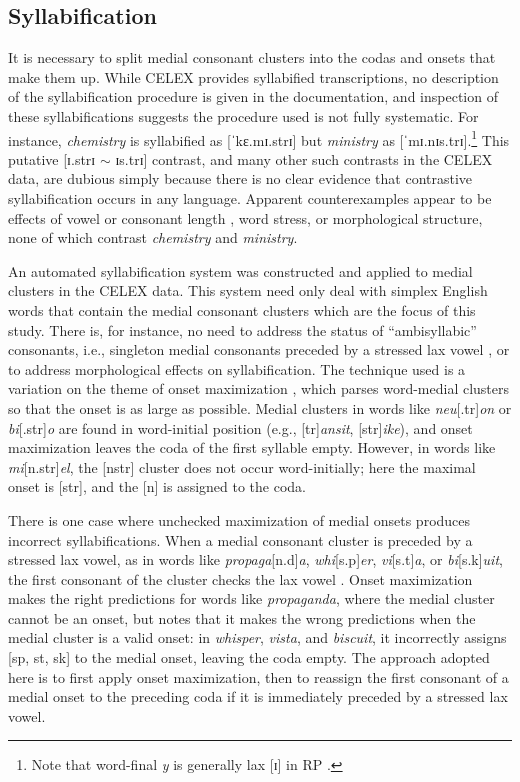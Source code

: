 \subsection{Syllabification}

It is necessary to split medial consonant clusters into the codas and onsets that make them up. While CELEX provides syllabified transcriptions, no description of the syllabification procedure is given in the documentation, and inspection of these syllabifications suggests the procedure used is not fully systematic. For instance, \emph{chemistry} is syllabified as [ˈkɛ.mɪ.strɪ] but \emph{ministry} as [ˈmɪ.nɪs.trɪ].\footnote{Note that word-final \emph{y} is generally lax [ɪ] in RP \citep[][294]{AOE2}.}
This putative [ɪ.strɪ $\sim$ ɪs.trɪ] contrast, and many other such contrasts in the CELEX data, are dubious simply because there is no clear evidence that contrastive syllabification occurs in any language. Apparent counterexamples appear to be effects of vowel or consonant length \citep[e.g.,][]{Elfner2006}, word stress, or morphological structure, none of which contrast \emph{chemistry} and \emph{ministry}.  

An automated syllabification system was constructed and applied to medial clusters in the CELEX data. This system need only deal with simplex English words that contain the medial consonant clusters which are the focus of this study.  There is, for instance, no need to address the status of ``ambisyllabic'' consonants, i.e., singleton medial consonants preceded by a stressed lax vowel \citep[][219f.]{Rubach1996}, or to address morphological effects on syllabification. The technique used is a variation on the theme of onset maximization \citep[42f.]{Kahn1976}, which parses word-medial clusters so that the onset is as large as possible. Medial clusters in words like \emph{neu}[.tr]\emph{on} or \emph{bi}[.str]\emph{o} are found in word-initial position (e.g., [tr]\emph{ansit}, [str]\emph{ike}), and onset maximization leaves the coda of the first syllable empty. However, in words like \emph{mi}[n.str]\emph{el}, the [nstr] cluster does not occur word-initially; here the maximal onset is [str], and the [n] is assigned to the coda.

There is one case where unchecked maximization of medial onsets produces incorrect syllabifications. When a medial consonant cluster is preceded by a stressed lax vowel, as in words like \emph{propaga}[n.d]\emph{a}, \emph{whi}[s.p]\emph{er}, \emph{vi}[s.t]\emph{a}, or \emph{bi}[s.k]\emph{uit}, the first consonant of the cluster checks the lax vowel \citep[e.g.,][3]{Hammond1997}. Onset maximization makes the right predictions for words like \emph{propaganda}, where the medial cluster cannot be an onset, but \citet[][55]{Harris1994} notes that it makes the wrong predictions when the medial cluster is a valid onset: in \emph{whisper}, \emph{vista}, and \emph{biscuit}, it incorrectly assigns [sp, st, sk] to the medial onset, leaving the coda empty. The approach adopted here is to first apply onset maximization, then to reassign the first consonant of a medial onset to the preceding coda if it is immediately preceded by a stressed lax vowel. 

